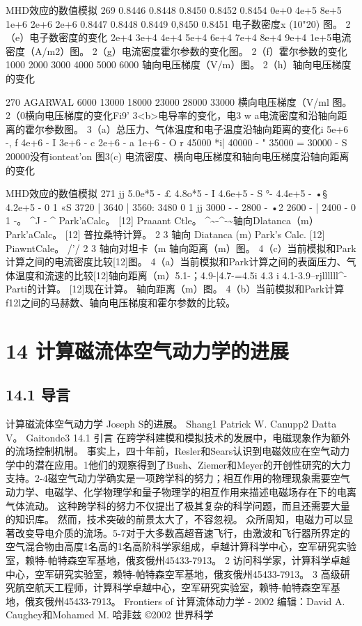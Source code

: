 \documentclass[UTF8,11pt,a4paper,openany,fontset=fandol]{ctexbook}
\begin{document}
MHD效应的数值模拟 269 0.8446 0.8448 0.8450 0.8452 0.8454 0e+0 4e+5 8e+5 1e+6 2e+6 2e+6 0.8447 0.8448 0.8449 0,8450 0.8451 电子数密度x (10"20) 图。 2（e）电子数密度的变化 2e+4 3e+4 4e+4 5e+4 6e+4 7e+4 8e+4 9e+4 1e+5电流密度（A/m2）图。 2（g）电流密度霍尔参数的变化图。 2（f）霍尔参数的变化 1000 2000 3000 4000 5000 6000 轴向电压梯度（V/m）图。 2（h）轴向电压梯度的变化

270 AGARWAL 6000 13000 18000 23000 28000 33000 横向电压梯度（V/ml 图。 2（0横向电压梯度的变化Fi9' 3<b>电导率的变化，电3 w a电流密度和沿轴向距离的霍尔参数图。 3（a）总压力、气体温度和电子温度沿轴向距离的变化i 5e+6 -, f 4e+6 - I 3e+6 - c 2e+6 - a 1e+6 - O r 45000 *i| 40000 - " 35000 = 30000 - S 20000没有ionteat'on 图3(c) 电流密度、横向电压梯度和轴向电压梯度沿轴向距离的变化

MHD效应的数值模拟 271 jj 5.0e*5 - £ 4.8o*5 - I 4.6e+5 - S °- 4.4e+5 - •§ 4.2e+5 - 0 1 «S 3720 | 3640 | 3560: 3480 0 1 jj 3000 - - 2800 - •2 2600 - | 2400 - 0 1 -。 \textasciicircum{}J - \textasciicircum{} Park'aCalc。 [12] Praaant Ctle。 \textasciicircum{}\textasciitilde{}-\textasciicircum{}-\textasciitilde{}轴向Dlatanca（m）Park'aCalc。 [12] 普拉桑特计算。 2 3 轴向 Diatanca (m) Park's Calc. [12] PiawntCale。 /'/ 2 3 轴向对坦卡（m 轴向距离（m）图。 4（c）当前模拟和Park计算之间的电流密度比较[12]图。 4（a）当前模拟和Park计算之间的表面压力、气体温度和流速的比较[12]轴向距离（m）5.1-；4.9-|4.7-=4.5i 4.3 i 4.1-3.9--rjllllll\textasciicircum{}-Parti的计算。 [12]现在计算。 轴向距离（m）图。 4（b）当前模拟和Park计算f12l之间的马赫数、轴向电压梯度和霍尔参数的比较。

\clearpage
\chapter{14 计算磁流体空气动力学的进展}
\section{14.1 导言}
计算磁流体空气动力学 Joseph S的进展。 Shang1 Patrick W. Canupp2 Datta V。 Gaitonde3 14.1 引言 在跨学科建模和模拟技术的发展中，电磁现象作为额外的流场控制机制。 事实上，四十年前，Resler和Sears认识到电磁效应在空气动力学中的潜在应用。1他们的观察得到了Bush、Ziemer和Meyer的开创性研究的大力支持。2-4磁空气动力学确实是一项跨学科的努力；相互作用的物理现象需要空气动力学、电磁学、化学物理学和量子物理学的相互作用来描述电磁场存在下的电离气体流动。 这种跨学科的努力不仅提出了极其复杂的科学问题，而且还需要大量的知识库。 然而，技术突破的前景太大了，不容忽视。 众所周知，电磁力可以显著改变导电介质的流场。5-7对于大多数高超音速飞行，由激波和飞行器所界定的空气混合物由高度1名高的1名高阶科学家组成，卓越计算科学中心，空军研究实验室，赖特-帕特森空军基地，俄亥俄州45433-7913。 2 访问科学家，计算科学卓越中心，空军研究实验室，赖特-帕特森空军基地，俄亥俄州45433-7913。 3 高级研究航空航天工程师，计算科学卓越中心，空军研究实验室，赖特-帕特森空军基地，俄亥俄州45433-7913。 Frontiers of 计算流体动力学 - 2002 编辑：David A. Caughey和Mohamed M. 哈菲兹 ©2002 世界科学
\end{document}
